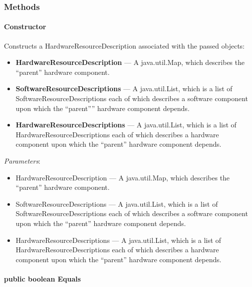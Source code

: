 \documentclass[$Date: 2003/06/26 19:29:31 $]{glabarticle}
\begin{document}

\subsubsection{Methods}

\paragraph{Constructor}

Constructs a HardwareResourceDescription associated with the passed objects:
\begin{itemize}
  \item \textbf{HardwareResourceDescription} --- A java.util.Map, which describes the ``parent'' hardware
  component.
  \item \textbf{SoftwareResourceDescriptions} --- A java.util.List, which is a list of SoftwareResourceDescriptions
  each of which describes a software component upon which the ``parent'''' hardware component depends.
  \item \textbf{HardwareResourceDescriptions} --- A java.util.List, which is a list of HardwareResourceDescriptions
  each of which describes a hardware component upon which the ``parent'' hardware component depends.\\
\end{itemize}

\textit{Parameters}:
\begin{itemize}
\item[] HardwareResourceDescription --- A java.util.Map, which describes the ``parent'' hardware component.
\item[] SoftwareResourceDescriptions --- A java.util.List, which is a list of SoftwareResourceDescriptions each of which
 describes a software component upon which the ``parent'' hardware component depends.
 \item[] HardwareResourceDescriptions --- A java.util.List, which is a list of HardwareResourceDescriptions
  each of which describes a hardware component upon which the ``parent'' hardware component depends.\\
\end{itemize}

\paragraph{public boolean Equals}
\end{document}
